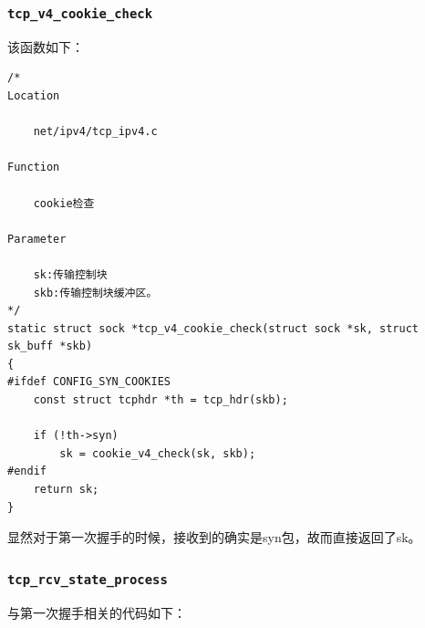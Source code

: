             \subsubsection{\texttt{tcp_v4_cookie_check}}
                该函数如下：
\begin{verbatim}
/*
Location

	net/ipv4/tcp_ipv4.c

Function

	cookie检查

Parameter

	sk:传输控制块
	skb:传输控制块缓冲区。	
*/
static struct sock *tcp_v4_cookie_check(struct sock *sk, struct sk_buff *skb)
{
#ifdef CONFIG_SYN_COOKIES
    const struct tcphdr *th = tcp_hdr(skb);

    if (!th->syn)
        sk = cookie_v4_check(sk, skb);
#endif
    return sk;
}
\end{verbatim}

                显然对于第一次握手的时候，接收到的确实是syn包，故而直接返回了sk。
            \subsubsection{\texttt{tcp_rcv_state_process}}
				\label{Server:tcp_rcv_state_process}
                与第一次握手相关的代码如下：

